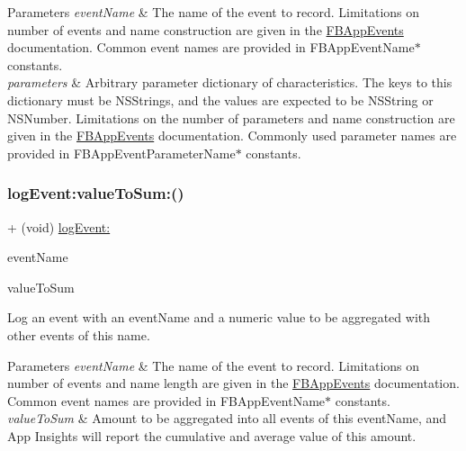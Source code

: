 \begin{DoxyParams}{Parameters}
{\em event\+Name} & The name of the event to record. Limitations on number of events and name construction are given in the {\ttfamily \hyperlink{interfaceFBAppEvents}{F\+B\+App\+Events}} documentation. Common event names are provided in {\ttfamily F\+B\+App\+Event\+Name$\ast$} constants.\\
\hline
{\em parameters} & Arbitrary parameter dictionary of characteristics. The keys to this dictionary must be N\+S\+String\textquotesingle{}s, and the values are expected to be N\+S\+String or N\+S\+Number. Limitations on the number of parameters and name construction are given in the {\ttfamily \hyperlink{interfaceFBAppEvents}{F\+B\+App\+Events}} documentation. Commonly used parameter names are provided in {\ttfamily F\+B\+App\+Event\+Parameter\+Name$\ast$} constants. \\
\hline
\end{DoxyParams}
\mbox{\label{interfaceFBAppEvents_a9ac18622973fab340ecf25c63c933a34}} 
\subsubsection{\texorpdfstring{log\+Event\+:value\+To\+Sum\+:()}{logEvent:valueToSum:()}\hspace{0.1cm}{\footnotesize\ttfamily [1/5]}}
{\footnotesize\ttfamily + (void) \hyperlink{interfaceFBAppEvents_a816373dd50bcf7381bf8194758ef8441}{log\+Event\+:} \begin{DoxyParamCaption}\item[{(N\+S\+String $\ast$)}]{event\+Name }\item[{valueToSum:(double)}]{value\+To\+Sum }\end{DoxyParamCaption}}

Log an event with an event\+Name and a numeric value to be aggregated with other events of this name.


\begin{DoxyParams}{Parameters}
{\em event\+Name} & The name of the event to record. Limitations on number of events and name length are given in the {\ttfamily \hyperlink{interfaceFBAppEvents}{F\+B\+App\+Events}} documentation. Common event names are provided in {\ttfamily F\+B\+App\+Event\+Name$\ast$} constants.\\
\hline
{\em value\+To\+Sum} & Amount to be aggregated into all events of this event\+Name, and App Insights will report the cumulative and average value of this amount. \\
\hline
\end{DoxyParams}
\mbox{\label{interfaceFBAppEvents_a9ac18622973fab340ecf25c63c933a34}} 

